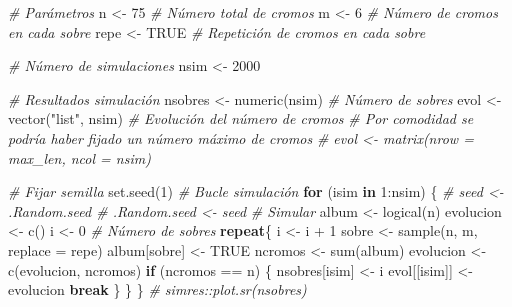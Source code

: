 \documentclass[
]{book}
\newenvironment{Shaded}{\begin{snugshade}}{\end{snugshade}}
\newcommand{\AttributeTok}[1]{\textcolor[rgb]{0.77,0.63,0.00}{#1}}
\newcommand{\CommentTok}[1]{\textcolor[rgb]{0.56,0.35,0.01}{\textit{#1}}}
\newcommand{\ConstantTok}[1]{\textcolor[rgb]{0.00,0.00,0.00}{#1}}
\newcommand{\ControlFlowTok}[1]{\textcolor[rgb]{0.13,0.29,0.53}{\textbf{#1}}}
\newcommand{\DecValTok}[1]{\textcolor[rgb]{0.00,0.00,0.81}{#1}}
\newcommand{\FunctionTok}[1]{\textcolor[rgb]{0.00,0.00,0.00}{#1}}
\newcommand{\NormalTok}[1]{#1}
\newcommand{\OtherTok}[1]{\textcolor[rgb]{0.56,0.35,0.01}{#1}}
\newcommand{\SpecialCharTok}[1]{\textcolor[rgb]{0.00,0.00,0.00}{#1}}
\newcommand{\StringTok}[1]{\textcolor[rgb]{0.31,0.60,0.02}{#1}}
\theoremstyle{break}
\theoremstyle{nonumberplain}
\begin{document}
\begin{Shaded}
\begin{Highlighting}[]
\CommentTok{\# Parámetros}
\NormalTok{n }\OtherTok{\textless{}{-}} \DecValTok{75} \CommentTok{\# Número total de cromos}
\NormalTok{m }\OtherTok{\textless{}{-}} \DecValTok{6}  \CommentTok{\# Número de cromos en cada sobre}
\NormalTok{repe }\OtherTok{\textless{}{-}} \ConstantTok{TRUE} \CommentTok{\# Repetición de cromos en cada sobre}

\CommentTok{\# Número de simulaciones}
\NormalTok{nsim }\OtherTok{\textless{}{-}} \DecValTok{2000}

\CommentTok{\# Resultados simulación}
\NormalTok{nsobres }\OtherTok{\textless{}{-}} \FunctionTok{numeric}\NormalTok{(nsim)      }\CommentTok{\# Número de sobres}
\NormalTok{evol }\OtherTok{\textless{}{-}} \FunctionTok{vector}\NormalTok{(}\StringTok{"list"}\NormalTok{, nsim)  }\CommentTok{\# Evolución del número de cromos}
\CommentTok{\# Por comodidad se podría haber fijado un número máximo de cromos}
\CommentTok{\# evol \textless{}{-} matrix(nrow = max\_len, ncol = nsim)}

\CommentTok{\# Fijar semilla}
\FunctionTok{set.seed}\NormalTok{(}\DecValTok{1}\NormalTok{)}
\CommentTok{\# Bucle simulación}
\ControlFlowTok{for}\NormalTok{ (isim }\ControlFlowTok{in} \DecValTok{1}\SpecialCharTok{:}\NormalTok{nsim) \{}
  \CommentTok{\# seed \textless{}{-} .Random.seed \# .Random.seed \textless{}{-} seed}
  \CommentTok{\# Simular}
\NormalTok{  album }\OtherTok{\textless{}{-}} \FunctionTok{logical}\NormalTok{(n)}
\NormalTok{  evolucion }\OtherTok{\textless{}{-}} \FunctionTok{c}\NormalTok{()}
\NormalTok{  i }\OtherTok{\textless{}{-}} \DecValTok{0} \CommentTok{\# Número de sobres}
  \ControlFlowTok{repeat}\NormalTok{\{}
\NormalTok{    i }\OtherTok{\textless{}{-}}\NormalTok{ i }\SpecialCharTok{+} \DecValTok{1}
\NormalTok{    sobre }\OtherTok{\textless{}{-}} \FunctionTok{sample}\NormalTok{(n, m, }\AttributeTok{replace =}\NormalTok{ repe)}
\NormalTok{    album[sobre] }\OtherTok{\textless{}{-}} \ConstantTok{TRUE}
\NormalTok{    ncromos }\OtherTok{\textless{}{-}} \FunctionTok{sum}\NormalTok{(album)}
\NormalTok{    evolucion }\OtherTok{\textless{}{-}} \FunctionTok{c}\NormalTok{(evolucion, ncromos)}
    \ControlFlowTok{if}\NormalTok{ (ncromos }\SpecialCharTok{==}\NormalTok{ n) \{}
\NormalTok{      nsobres[isim] }\OtherTok{\textless{}{-}}\NormalTok{ i}
\NormalTok{      evol[[isim]] }\OtherTok{\textless{}{-}}\NormalTok{ evolucion}
      \ControlFlowTok{break}
\NormalTok{    \}}
\NormalTok{  \}}
\NormalTok{\}}
\CommentTok{\# simres::plot.sr(nsobres)}
\end{Highlighting}
\end{Shaded}
\end{document}
